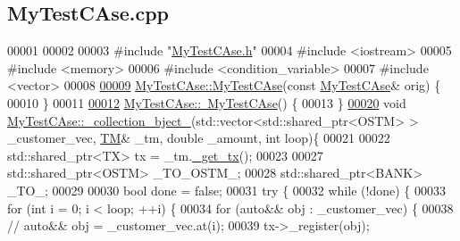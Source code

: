 \hypertarget{_my_test_c_ase_8cpp_source}{}\subsection{My\+Test\+C\+Ase.\+cpp}

\begin{DoxyCode}
00001 
00002 
00003 \textcolor{preprocessor}{#include "\hyperlink{_my_test_c_ase_8h}{MyTestCAse.h}"}
00004 \textcolor{preprocessor}{#include <iostream>}
00005 \textcolor{preprocessor}{#include <memory>}
00006 \textcolor{preprocessor}{#include <condition\_variable>}
00007 \textcolor{preprocessor}{#include <vector>}
00008 
\hypertarget{_my_test_c_ase_8cpp_source.tex_l00009}{}\hyperlink{class_my_test_c_ase_a742539c4ae7c357cc96295641d2c604d_a742539c4ae7c357cc96295641d2c604d}{00009} \hyperlink{class_my_test_c_ase_a17e7a9246f54f74dacf88f8d6556aa92_a17e7a9246f54f74dacf88f8d6556aa92}{MyTestCAse::MyTestCAse}(\textcolor{keyword}{const} \hyperlink{class_my_test_c_ase}{MyTestCAse}& orig) \{
00010 \}
00011 
\hypertarget{_my_test_c_ase_8cpp_source.tex_l00012}{}\hyperlink{class_my_test_c_ase_a6e57067745a7e72a8073c945e0266c56_a6e57067745a7e72a8073c945e0266c56}{00012} \hyperlink{class_my_test_c_ase_a6e57067745a7e72a8073c945e0266c56_a6e57067745a7e72a8073c945e0266c56}{MyTestCAse::~MyTestCAse}() \{
00013 \}
\hypertarget{_my_test_c_ase_8cpp_source.tex_l00020}{}\hyperlink{class_my_test_c_ase_a9ec1ddfc6e7f727446e1a8355086c2dd_a9ec1ddfc6e7f727446e1a8355086c2dd}{00020} \textcolor{keywordtype}{void} \hyperlink{class_my_test_c_ase_a9ec1ddfc6e7f727446e1a8355086c2dd_a9ec1ddfc6e7f727446e1a8355086c2dd}{MyTestCAse::\_collection\_bject\_}(std::vector<std::shared\_ptr<OSTM> > 
      \_customer\_vec, \hyperlink{class_t_m}{TM}& \_tm, \textcolor{keywordtype}{double} \_amount, \textcolor{keywordtype}{int} loop)\{
00021     
00022      std::shared\_ptr<TX> tx = \_tm.\hyperlink{class_t_m_a41cb0226cc4080c931651b13f74a0075_a41cb0226cc4080c931651b13f74a0075}{\_get\_tx}();
00023 
00027     std::shared\_ptr<OSTM> \_TO\_OSTM\_;
00028     std::shared\_ptr<BANK>  \_TO\_;
00029 
00030     \textcolor{keywordtype}{bool} done = \textcolor{keyword}{false};
00031     \textcolor{keywordflow}{try} \{
00032         \textcolor{keywordflow}{while} (!done) \{
00033             \textcolor{keywordflow}{for} (\textcolor{keywordtype}{int} i = 0; i < loop; ++i) \{
00034                 \textcolor{keywordflow}{for} (\textcolor{keyword}{auto}&& obj : \_customer\_vec) \{
00038                     \textcolor{comment}{// auto&& obj = \_customer\_vec.at(i);}
00039                     tx->\_register(obj);

\end{DoxyCode}
